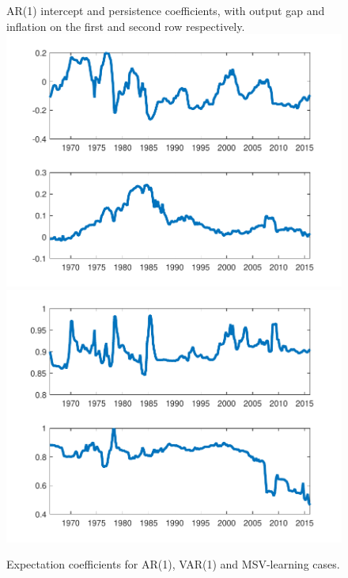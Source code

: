 \documentclass[12pt,reqno]{article}
\numberwithin{equation}{section}
\begin{document}
\begin{figure}[H]
\label{nkpc_learning_coef}

\caption{Expectation coefficients for AR(1), VAR(1) and MSV-learning cases.}
\vspace{5 mm}
{AR(1) intercept and persistence coefficients, with output gap and inflation on the first and second row respectively.}\\
\includegraphics[scale=0.35]{NKPC_ree_init_AR1_alphas.pdf}
\includegraphics[scale=0.35]{NKPC_ree_init_AR1_betas.pdf}\\


\end{figure}
\end{document}
